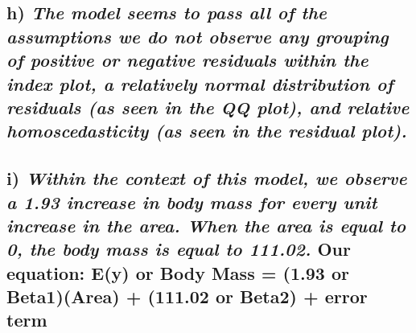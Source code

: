 \documentclass[
]{article}
\begin{document}
\hypertarget{h-the-model-seems-to-pass-all-of-the-assumptions-we-do-not-observe-any-grouping-of-positive-or-negative-residuals-within-the-index-plot-a-relatively-normal-distribution-of-residuals-as-seen-in-the-qq-plot-and-relative-homoscedasticity-as-seen-in-the-residual-plot.}{%
\subsection{\texorpdfstring{h) \emph{The model seems to pass all of the
assumptions we do not observe any grouping of positive or negative
residuals within the index plot, a relatively normal distribution of
residuals (as seen in the QQ plot), and relative homoscedasticity (as
seen in the residual
plot).}}{h) The model seems to pass all of the assumptions we do not observe any grouping of positive or negative residuals within the index plot, a relatively normal distribution of residuals (as seen in the QQ plot), and relative homoscedasticity (as seen in the residual plot).}}\label{h-the-model-seems-to-pass-all-of-the-assumptions-we-do-not-observe-any-grouping-of-positive-or-negative-residuals-within-the-index-plot-a-relatively-normal-distribution-of-residuals-as-seen-in-the-qq-plot-and-relative-homoscedasticity-as-seen-in-the-residual-plot.}}

\hypertarget{i-within-the-context-of-this-model-we-observe-a-1.93-increase-in-body-mass-for-every-unit-increase-in-the-area.-when-the-area-is-equal-to-0-the-body-mass-is-equal-to-111.02.-our-equation-ey-or-body-mass-1.93-or-beta1area-111.02-or-beta2-error-term}{%
\subsection{\texorpdfstring{i) \emph{Within the context of this model,
we observe a 1.93 increase in body mass for every unit increase in the
area. When the area is equal to 0, the body mass is equal to 111.02.}
Our equation: E(y) or Body Mass = (1.93 or Beta1)(Area) + (111.02 or
Beta2) + error
term}{i) Within the context of this model, we observe a 1.93 increase in body mass for every unit increase in the area. When the area is equal to 0, the body mass is equal to 111.02. Our equation: E(y) or Body Mass = (1.93 or Beta1)(Area) + (111.02 or Beta2) + error term}}\label{i-within-the-context-of-this-model-we-observe-a-1.93-increase-in-body-mass-for-every-unit-increase-in-the-area.-when-the-area-is-equal-to-0-the-body-mass-is-equal-to-111.02.-our-equation-ey-or-body-mass-1.93-or-beta1area-111.02-or-beta2-error-term}}
\end{document}
